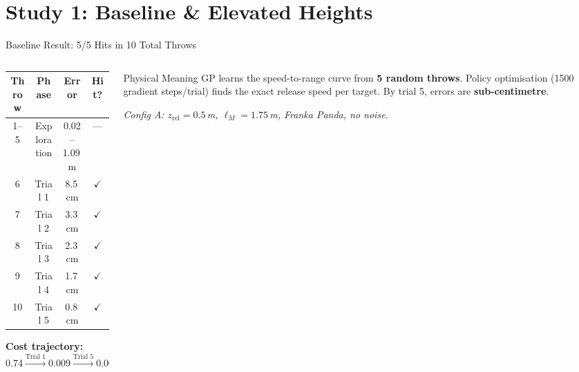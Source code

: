 \documentclass{if-beamer}
\begin{document}
\section{Study 1: Baseline \& Elevated Heights}

\begin{frame}{Baseline Result: 5/5 Hits in 10 Total Throws}
    \begin{columns}[T]
        \begin{column}{0.45\textwidth}
            \small
            \begin{tabular}{cccc}
                \toprule
                \textbf{Throw} & \textbf{Phase} & \textbf{Error} & \textbf{Hit?} \\
                \midrule
                1--5 & Exploration & 0.02--1.09\,m & --- \\
                6 & Trial 1 & 8.5\,cm & \textcolor{green!60!black}{$\checkmark$} \\
                7 & Trial 2 & 3.3\,cm & \textcolor{green!60!black}{$\checkmark$} \\
                8 & Trial 3 & 2.3\,cm & \textcolor{green!60!black}{$\checkmark$} \\
                9 & Trial 4 & 1.7\,cm & \textcolor{green!60!black}{$\checkmark$} \\
                10 & Trial 5 & 0.8\,cm & \textcolor{green!60!black}{$\checkmark$} \\
                \bottomrule
            \end{tabular}
            \vspace{0.5em}

            \textbf{Cost trajectory:}\\
            $0.74 \xrightarrow{\text{Trial 1}} 0.009 \xrightarrow{\text{Trial 5}} 0.001$
        \end{column}
        \begin{column}{0.52\textwidth}
            \begin{block}{Physical Meaning}
                GP learns the speed-to-range curve from \textbf{5 random throws}. Policy optimisation (1500 gradient steps/trial) finds the exact release speed per target. By trial 5, errors are \textbf{sub-centimetre}.
            \end{block}
            \vspace{0.3em}
            \textit{Config A: $z_\text{rel} = 0.5$\,m, $\ell_M = 1.75$\,m, Franka Panda, no noise.}
        \end{column}
    \end{columns}
\end{frame}
\end{document}
